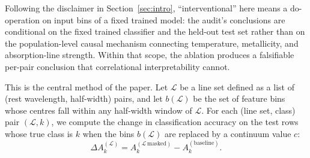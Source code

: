 \documentclass[11pt,a4paper]{article}
\newcommand{\dA}{\Delta A}
\begin{document}
Following the disclaimer in Section~\ref{sec:intro}, ``interventional'' here means a $\mathrm{do}$-operation on input bins of a fixed trained model: the audit's conclusions are conditional on the fixed trained classifier and the held-out test set rather than on the population-level causal mechanism connecting temperature, metallicity, and absorption-line strength. Within that scope, the ablation produces a falsifiable per-pair conclusion that correlational interpretability cannot.

This is the central method of the paper. Let $\mathcal{L}$ be a line set defined as a list of (rest wavelength, half-width) pairs, and let $b(\mathcal{L})$ be the set of feature bins whose centres fall within any half-width window of $\mathcal{L}$. For each (line set, class) pair $(\mathcal{L}, k)$, we compute the change in classification accuracy on the test rows whose true class is $k$ when the bins $b(\mathcal{L})$ are replaced by a continuum value $c$:
\begin{equation}
\dA_k^{(\mathcal{L})} = A_k^{(\mathcal{L}\,\text{masked})} - A_k^{(\text{baseline})}.
\label{eq:delta-acc}
\end{equation}
\end{document}
